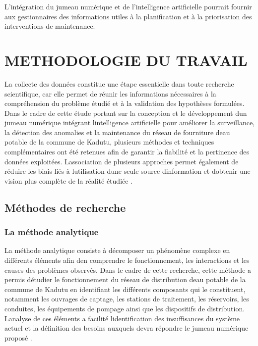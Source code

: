 L'intégration du jumeau numérique et de l'intelligence artificielle
pourrait fournir aux gestionnaires des informations utiles à la
planification et à la priorisation des interventions de maintenance.

\section{METHODOLOGIE DU TRAVAIL}\label{muxe9thodes-et-techniques-de-collecte-des-donnuxe9es}

La collecte des données constitue une étape essentielle dans toute
recherche scientifique, car elle permet de réunir les informations
nécessaires à la compréhension du problème étudié et à la validation des
hypothèses formulées. Dans le cadre de cette étude portant sur la conception et le
développement d\textquotesingle un jumeau numérique intégrant
l\textquotesingle intelligence artificielle pour améliorer la
surveillance, la détection des anomalies et la maintenance du réseau de
fourniture d\textquotesingle eau potable de la commune de Kadutu, plusieurs
méthodes et techniques complémentaires ont été retenues afin de garantir
la fiabilité et la pertinence des données exploitées.
L\textquotesingle association de plusieurs approches permet également de
réduire les biais liés à l\textquotesingle utilisation
d\textquotesingle une seule source d\textquotesingle information et
d\textquotesingle obtenir une vision plus complète de la réalité étudiée
\cite{ref75}.

\subsection{Méthodes de recherche}\label{muxe9thodes-de-recherche}

\subsubsection{La méthode
	analytique}\label{a-la-muxe9thode-analytique}

La méthode analytique consiste à décomposer un phénomène complexe en
différents éléments afin d\textquotesingle en comprendre le
fonctionnement, les interactions et les causes des problèmes observés.
Dans le cadre de cette recherche, cette méthode a permis
d\textquotesingle étudier le fonctionnement du réseau de distribution
d\textquotesingle eau potable de la commune de Kadutu en identifiant les
différents composants qui le constituent, notamment les ouvrages de
captage, les stations de traitement, les réservoirs, les conduites, les
équipements de pompage ainsi que les dispositifs de distribution.
L\textquotesingle analyse de ces éléments a facilité
l\textquotesingle identification des insuffisances du système actuel et
la définition des besoins auxquels devra répondre le jumeau numérique
proposé \cite{ref108}.

